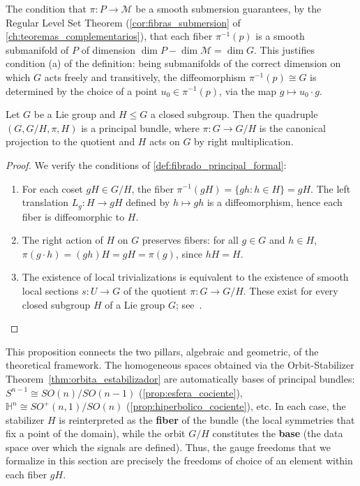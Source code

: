 \begin{remark}\label{rem:fibras_subvariedad}
The condition that $\pi: P \to \mathcal{M}$ be a smooth submersion guarantees, by the Regular Level Set Theorem (\autoref{cor:fibras_submersion} of \autoref{ch:teoremas_complementarios}), that each fiber $\pi^{-1}(p)$ is a smooth submanifold of $P$ of dimension $\dim P - \dim \mathcal{M} = \dim G$. This justifies condition (a) of the definition: being submanifolds of the correct dimension on which $G$ acts freely and transitively, the diffeomorphism $\pi^{-1}(p) \cong G$ is determined by the choice of a point $u_0 \in \pi^{-1}(p)$, via the map $g \mapsto u_0 \cdot g$.
\end{remark}

\begin{proposition}\label{prop:homogeneo_fibrado}
Let $G$ be a Lie group and $H \leq G$ a closed subgroup. Then the quadruple $(G, G/H, \pi, H)$ is a principal bundle, where $\pi: G \to G/H$ is the canonical projection to the quotient and $H$ acts on $G$ by right multiplication.
\end{proposition}

\begin{proof}
We verify the conditions of \autoref{def:fibrado_principal_formal}:
\begin{enumerate}
	\item[(a)] For each coset $gH \in G/H$, the fiber $\pi^{-1}(gH) = \{gh : h \in H\} = gH$. The left translation $L_g: H \to gH$ defined by $h \mapsto gh$ is a diffeomorphism, hence each fiber is diffeomorphic to $H$.

	\item[(b)] The right action of $H$ on $G$ preserves fibers: for all $g \in G$ and $h \in H$, $\pi(g \cdot h) = (gh)H = gH = \pi(g)$, since $hH = H$.

	\item[(c)] The existence of local trivializations is equivalent to the existence of smooth local sections $s: U \to G$ of the quotient $\pi: G \to G/H$. These exist for every closed subgroup $H$ of a Lie group $G$; see~\citep[Ch.~I, Prop.~5.5]{Kobayashi1996}.
\end{enumerate}
\end{proof}

This proposition connects the two pillars, algebraic and geometric, of the theoretical framework. The homogeneous spaces obtained via the Orbit-Stabilizer Theorem~\ref{thm:orbita_estabilizador} are automatically bases of principal bundles: $S^{n-1} \cong SO(n)/SO(n-1)$ (\autoref{prop:esfera_cociente}), $\mathbb{H}^n \cong SO^+(n,1)/SO(n)$ (\autoref{prop:hiperbolico_cociente}), etc. In each case, the stabilizer $H$ is reinterpreted as the \textbf{fiber} of the bundle (the local symmetries that fix a point of the domain), while the orbit $G/H$ constitutes the \textbf{base} (the data space over which the signals are defined). Thus, the gauge freedoms that we formalize in this section are precisely the freedoms of choice of an element within each fiber $gH$.

